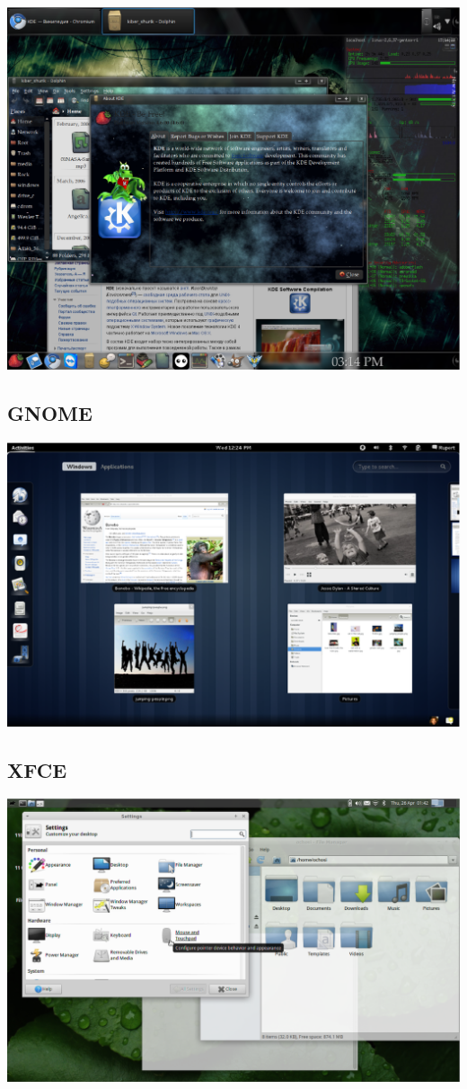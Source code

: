 \includegraphics[scale=0.38]{base/Software/KDE2.eps}
\subsection{GNOME}\label{base:software:de:gnome}
\includegraphics[scale=0.5]{base/Software/Gnome.eps}
\subsection{XFCE}\label{base:software:de:xfce}
\includegraphics[scale=0.28]{base/Software/XFCE.eps}
